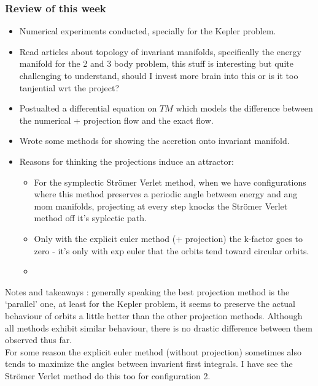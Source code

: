 \documentclass[12pt]{article}
\begin{document}
\subsubsection{Review of this week}
\begin{itemize}
    \item Numerical experiments conducted, specially for the Kepler problem.
    \item Read articles about topology of invariant manifolds, specifically the energy manifold for the 2 and 3 body problem, this stuff is interesting but quite challenging to understand, should I invest more brain into this or is it too tanjential wrt the project?
    \item Postualted a differential equation on $TM$ which models the difference between the numerical + projection flow and the exact flow. 
    \item Wrote some methods for showing the accretion onto invariant manifold.
    \item Reasons for thinking the projections induce an attractor:
    \begin{itemize}
        \item For the symplectic Str\"omer Verlet method, when we have configurations where this method preserves a periodic angle between energy and ang mom manifolds, projecting at every step knocks the Str\"omer Verlet method off it's syplectic path.
        \item Only with the explicit euler method (+ projection) the k-factor goes to zero - it's only with exp euler that the orbits tend toward circular orbits.
        \item 
    \end{itemize}
\end{itemize}
Notes and takeaways : generally speaking the best projection method is the `parallel' one, at least for the Kepler problem, it seems to preserve the actual behaviour of orbits a little better than the other projection methods. Although all methods exhibit similar behaviour, there is no drastic difference between them observed thus far. \\

For some reason the explicit euler method (without projection) sometimes also tends to maximize the angles between invarient first integrals. I have see the Str\"omer Verlet method do this too for configuration 2.\\
\end{document}
